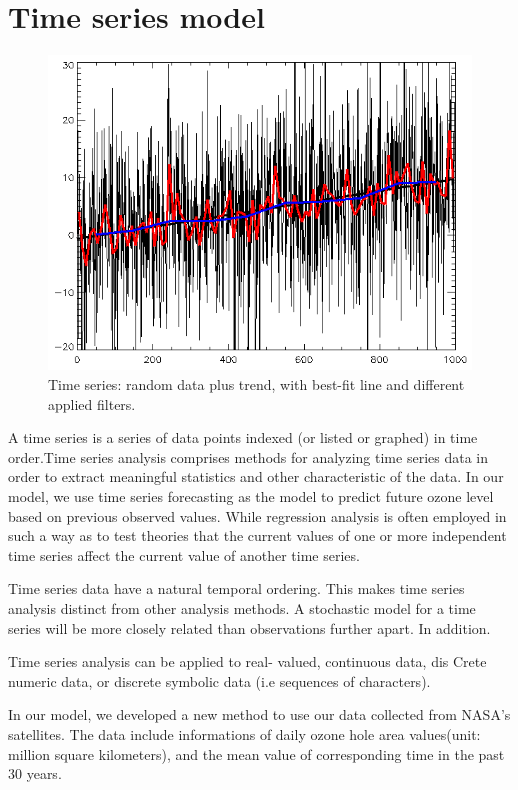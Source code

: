 \documentclass[12pt]{article}
\begin{document}
\section{Time series model}
\begin{center}
\begin{figure}[htpb]
\centering
\includegraphics[scale=0.35]{ts_model}
\caption{Time series: random data plus trend, with best-fit line and different applied filters.}\label{fig:ts_exam}
\end{figure}
\end{center}
A time series is a series of data points indexed (or listed or graphed) in time order.Time series analysis comprises methods for analyzing time series data in order to extract meaningful statistics and other characteristic of the data. In our model, we use time series forecasting as the model to predict future ozone level based on previous observed values. While regression analysis is often employed in such a way as to test theories that the current values of one or more independent time series affect the current value of another time series.

Time series data have a natural temporal ordering. This makes time series analysis distinct from other analysis methods.  A stochastic model for a time series will be more closely related than observations further apart. In addition. 

Time series analysis can be applied to real- valued, continuous data, dis Crete numeric data, or discrete symbolic data (i.e sequences of characters).

In our model, we developed a new method to use our data collected from NASA's satellites. The data include informations of daily ozone hole area values(unit: million square  kilometers), and the mean value of corresponding time in the past 30 years.
\end{document}
